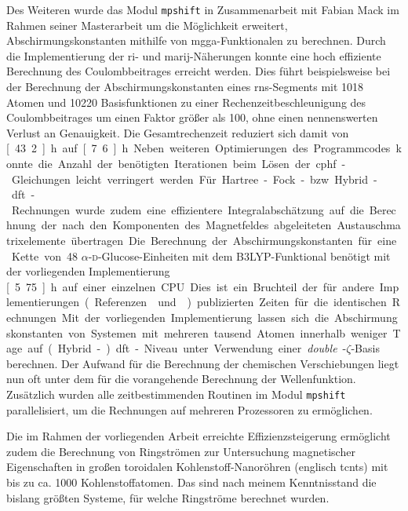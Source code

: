 Des Weiteren wurde das Modul \texttt{mpshift} in Zusammenarbeit mit Fabian Mack im Rahmen seiner Masterarbeit um die Möglichkeit erweitert, Abschirmungskonstanten mithilfe von \ac{mgga}-Funktionalen zu berechnen. 
\vfill
\newpage
Durch die Implementierung der \ac{ri}- und \ac{marij}-Näherungen konnte eine hoch effiziente Berechnung des Coulombbeitrages erreicht werden. Dies führt beispielsweise bei der Berechnung der Abschirmungskonstanten eines \ac{rns}-Segments mit 1018 Atomen und 10220 Basisfunktionen zu einer Rechenzeitbeschleunigung des Coulombbeitrages um einen Faktor größer als 100, ohne einen nennenswerten Verlust an Genauigkeit. Die Gesamtrechenzeit reduziert sich damit von \unit[43.2]{h} auf \unit[7.6]{h}. Neben weiteren Optimierungen des Programmcodes konnte die Anzahl der benötigten Iterationen beim Lösen der \ac{cphf}-Gleichungen leicht verringert werden. Für Hartree-Fock- bzw. Hybrid-\ac{dft}-Rechnungen wurde zudem eine effizientere Integralabschätzung auf die Berechnung der nach den Komponenten des Magnetfeldes abgeleiteten Austauschmatrixelemente übertragen. Die Berechnung der Abschirmungskonstanten für eine Kette von 48 $\alpha$-\textsc{d}-Glucose-Einheiten mit dem B3LYP-Funktional benötigt mit der vorliegenden Implementierung \unit[5.75]{h} auf einer einzelnen CPU. Dies ist ein Bruchteil der für andere Implementierungen (Referenzen \cite{beer2011nuclei} und \cite{kumar2016nuclei}) publizierten Zeiten für die identischen Rechnungen. Mit der vorliegenden Implementierung lassen sich die Abschirmungskonstanten von Systemen mit mehreren tausend Atomen innerhalb weniger Tage auf (Hybrid-)\ac{dft}-Niveau unter Verwendung einer \textit{double}-$\zeta$-Basis berechnen. Der Aufwand für die Berechnung der chemischen Verschiebungen liegt nun oft unter dem für die vorangehende Berechnung der Wellenfunktion. Zusätzlich wurden alle zeitbestimmenden Routinen im Modul \texttt{mpshift} parallelisiert, um die Rechnungen auf mehreren Prozessoren zu ermöglichen.

\bigskip
Die im Rahmen der vorliegenden Arbeit erreichte Effizienzsteigerung ermöglicht zudem die Berechnung von Ringströmen zur Untersuchung magnetischer Eigenschaften in großen toroidalen Kohlenstoff-Nanoröhren (englisch \acfp{tcnt}) mit bis zu ca. 1000 Kohlenstoffatomen. Das sind nach meinem Kenntnisstand die bislang größten Systeme, für welche Ringströme berechnet wurden. 

